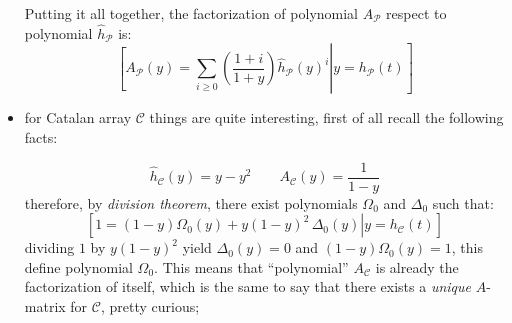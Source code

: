 \begin{itemize}
        Putting it all together, the factorization of polynomial 
        $A_{\mathcal{P}}$ respect to polynomial $\hat{h}_{\mathcal{P}}$ is:
        \begin{displaymath}
                \left.\left[
                    A_{\mathcal{P}}(y) = \sum_{i \geq0}{\left(\frac{1+i}{1+y}\right)
                        \hat{h}_{\mathcal{P}}(y)^{i}} \right| y = h_{\mathcal{P}}(t) \right]
        \end{displaymath}

    \item for Catalan array $\mathcal{C}$ things are quite interesting,
        first of all recall the following facts:

        \begin{displaymath} 
            \hat{h}_{\mathcal{C}}(y)=y-y^2 \quad\quad 
                A_{\mathcal{C}}(y)=\frac{1}{1-y}
        \end{displaymath} 
        therefore, by \emph{division theorem}, 
        there exist polynomials $\Omega_{0}$ and $\Delta_{0}$ such that:
        \begin{displaymath}
            \left.\left[
                1 = (1-y)\Omega_{0}(y) + y(1-y)^{2}\,\Delta_{0}(y) 
                    \right| y = h_{\mathcal{C}}(t) \right]
        \end{displaymath}
        dividing $1$ by $y(1-y)^2$ yield $\Delta_{0}(y)=0$ 
        and $(1-y)\Omega_{0}(y)=1$, this define polynomial $\Omega_{0}$. 
        This means that ``polynomial'' $A_{\mathcal{C}}$ is already
        the factorization of itself, which is the same to say that
        there exists a \emph{unique} $A$-matrix for $\mathcal{C}$, pretty curious;


\end{itemize}
